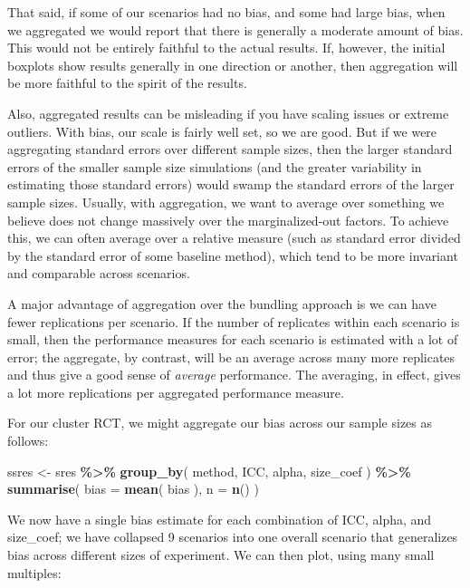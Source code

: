 \documentclass[
]{book}
\newenvironment{Shaded}{\begin{snugshade}}{\end{snugshade}}
\newcommand{\AttributeTok}[1]{\textcolor[rgb]{0.13,0.29,0.53}{#1}}
\newcommand{\FunctionTok}[1]{\textcolor[rgb]{0.13,0.29,0.53}{\textbf{#1}}}
\newcommand{\NormalTok}[1]{#1}
\newcommand{\OtherTok}[1]{\textcolor[rgb]{0.56,0.35,0.01}{#1}}
\newcommand{\SpecialCharTok}[1]{\textcolor[rgb]{0.81,0.36,0.00}{\textbf{#1}}}
\begin{document}
That said, if some of our scenarios had no bias, and some had large bias, when we aggregated we would report that there is generally a moderate amount of bias.
This would not be entirely faithful to the actual results.
If, however, the initial boxplots show results generally in one direction or another, then aggregation will be more faithful to the spirit of the results.

Also, aggregated results can be misleading if you have scaling issues or extreme outliers.
With bias, our scale is fairly well set, so we are good.
But if we were aggregating standard errors over different sample sizes, then the larger standard errors of the smaller sample size simulations (and the greater variability in estimating those standard errors) would swamp the standard errors of the larger sample sizes.
Usually, with aggregation, we want to average over something we believe does not change massively over the marginalized-out factors.
To achieve this, we can often average over a relative measure (such as standard error divided by the standard error of some baseline method), which tend to be more invariant and comparable across scenarios.

A major advantage of aggregation over the bundling approach is we can have fewer replications per scenario.
If the number of replicates within each scenario is small, then the performance measures for each scenario is estimated with a lot of error; the aggregate, by contrast, will be an average across many more replicates and thus give a good sense of \emph{average} performance.
The averaging, in effect, gives a lot more replications per aggregated performance measure.

For our cluster RCT, we might aggregate our bias across our sample sizes as follows:

\begin{Shaded}
\begin{Highlighting}[]
\NormalTok{ssres }\OtherTok{\textless{}{-}} 
\NormalTok{  sres }\SpecialCharTok{\%\textgreater{}\%} 
  \FunctionTok{group\_by}\NormalTok{( method, ICC, alpha, size\_coef ) }\SpecialCharTok{\%\textgreater{}\%}
  \FunctionTok{summarise}\NormalTok{( }\AttributeTok{bias =} \FunctionTok{mean}\NormalTok{( bias ),}
             \AttributeTok{n =} \FunctionTok{n}\NormalTok{() )}
\end{Highlighting}
\end{Shaded}

We now have a single bias estimate for each combination of ICC, alpha, and size\_coef; we have collapsed 9 scenarios into one overall scenario that generalizes bias across different sizes of experiment.
We can then plot, using many small multiples:
\end{document}
